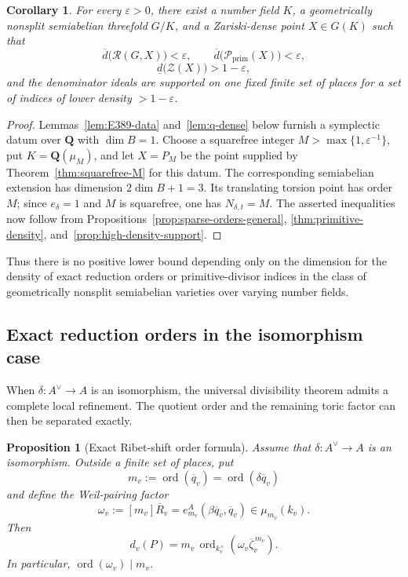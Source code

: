 \documentclass[11pt,letterpaper,reqno]{amsart}
\newtheorem{proposition}[theorem]{Proposition}
\newtheorem{corollary}[theorem]{Corollary}
\theoremstyle{definition}
\theoremstyle{remark}
\newcommand{\Q}{\mathbf Q}
\newcommand{\ord}{\operatorname{ord}}
\begin{document}
\begin{corollary}
\label{cor:extremal-density}
For every $\varepsilon>0$, there exist a number field $K$, a geometrically
nonsplit semiabelian threefold $G/K$, and a Zariski-dense point $X\in G(K)$
such that
\[
 \overline d\bigl(\mathscr R(G,X)\bigr)<\varepsilon,
 \qquad
 \overline d\bigl(\mathcal P_{\mathrm{prim}}(X)\bigr)<\varepsilon,
\]
\[
 \underline d\bigl(\mathcal Z(X)\bigr)>1-\varepsilon,
\]
and the denominator ideals are supported on one fixed finite set of places for
a set of indices of lower density $>1-\varepsilon$.
\end{corollary}

\begin{proof}
Lemmas~\ref{lem:E389-data} and~\ref{lem:q-dense} below furnish a
symplectic datum over $\Q$ with $\dim B=1$.  Choose a squarefree integer
$M>\max\{1,\varepsilon^{-1}\}$, put $K=\Q(\mu_M)$, and let $X=P_M$ be the
point supplied by Theorem~\ref{thm:squarefree-M} for this datum.  The
corresponding semiabelian extension has dimension
$2\dim B+1=3$.  Its translating torsion point has order $M$; since
$e_\delta=1$ and $M$ is squarefree, one has $N_{\delta,t}=M$.  The asserted
inequalities now follow from
Propositions~\ref{prop:sparse-orders-general},
\ref{thm:primitive-density}, and~\ref{prop:high-density-support}.
\end{proof}

Thus there is no positive lower bound depending only on the dimension for the
density of exact reduction orders or primitive-divisor indices in the class of
geometrically nonsplit semiabelian varieties over varying number fields.

\subsection{Exact reduction orders in the isomorphism case}
\label{sec:exact}

When $\delta:A^\vee\to A$ is an isomorphism, the universal divisibility
theorem admits a complete local refinement.  The quotient order and the
remaining toric factor can then be separated exactly.

\begin{proposition}[Exact Ribet-shift order formula]\label{thm:exact-order}
Assume that $\delta:A^\vee\to A$ is an isomorphism.  Outside a finite set of places, put
\[
 m_v:=\ord(\overline q_v)
     =\ord(\delta\overline q_v)
\]
and define the Weil-pairing factor
\begin{equation}\label{eq:omega-pairing}
 \omega_v:=[m_v]\overline R_v
 =e_{m_v}^A(\beta\overline q_v,\overline q_v)
 \in\mu_{m_v}(k_v).
\end{equation}
Then
\begin{equation}\label{eq:exact-order-formula}
 d_v(P)
 =m_v\,
 \ord_{k_v^\times}\!\left(\omega_v\overline\zeta_v^{\,m_v}\right).
\end{equation}
In particular, $\ord(\omega_v)\mid m_v$.
\end{proposition}
\end{document}
